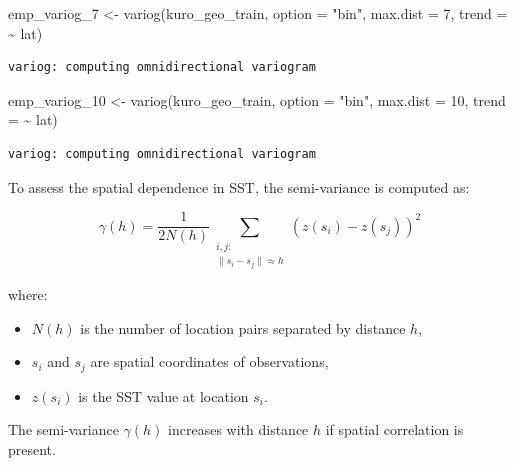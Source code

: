 \documentclass[
  11pt,
]{article}
\newenvironment{Shaded}{\begin{snugshade}}{\end{snugshade}}
\newcommand{\AttributeTok}[1]{\textcolor[rgb]{0.40,0.45,0.13}{#1}}
\newcommand{\DecValTok}[1]{\textcolor[rgb]{0.68,0.00,0.00}{#1}}
\newcommand{\FunctionTok}[1]{\textcolor[rgb]{0.28,0.35,0.67}{#1}}
\newcommand{\NormalTok}[1]{\textcolor[rgb]{0.00,0.23,0.31}{#1}}
\newcommand{\OtherTok}[1]{\textcolor[rgb]{0.00,0.23,0.31}{#1}}
\newcommand{\SpecialCharTok}[1]{\textcolor[rgb]{0.37,0.37,0.37}{#1}}
\newcommand{\StringTok}[1]{\textcolor[rgb]{0.13,0.47,0.30}{#1}}
\begin{document}
\begin{Shaded}
\begin{Highlighting}[]
\NormalTok{emp\_variog\_7 }\OtherTok{\textless{}{-}} \FunctionTok{variog}\NormalTok{(kuro\_geo\_train, }\AttributeTok{option =} \StringTok{"bin"}\NormalTok{, }\AttributeTok{max.dist =} \DecValTok{7}\NormalTok{, }\AttributeTok{trend =} \SpecialCharTok{\textasciitilde{}}\NormalTok{ lat)}
\end{Highlighting}
\end{Shaded}

\begin{verbatim}
variog: computing omnidirectional variogram
\end{verbatim}

\begin{Shaded}
\begin{Highlighting}[]
\NormalTok{emp\_variog\_10 }\OtherTok{\textless{}{-}} \FunctionTok{variog}\NormalTok{(kuro\_geo\_train, }\AttributeTok{option =} \StringTok{"bin"}\NormalTok{, }\AttributeTok{max.dist =} \DecValTok{10}\NormalTok{, }\AttributeTok{trend =} \SpecialCharTok{\textasciitilde{}}\NormalTok{ lat)}
\end{Highlighting}
\end{Shaded}

\begin{verbatim}
variog: computing omnidirectional variogram
\end{verbatim}

To assess the spatial dependence in SST, the semi-variance is computed
as:

\[
\gamma(h) = \frac{1}{2N(h)} \sum_{\substack{i,j: \\ \|s_i - s_j\| \approx h}} \left( z(s_i) - z(s_j) \right)^2
\]

where:

\begin{itemize}
\item
  \(N(h)\) is the number of location pairs separated by distance \(h\),
\item
  \(s_i\) and \(s_j\) are spatial coordinates of observations,
\item
  \(z\)\((s_i)\) is the SST value at location \(s_i\)\hspace{0pt}.
\end{itemize}

The semi-variance \(\gamma(h)\) increases with distance \(h\) if spatial
correlation is present.
\end{document}
